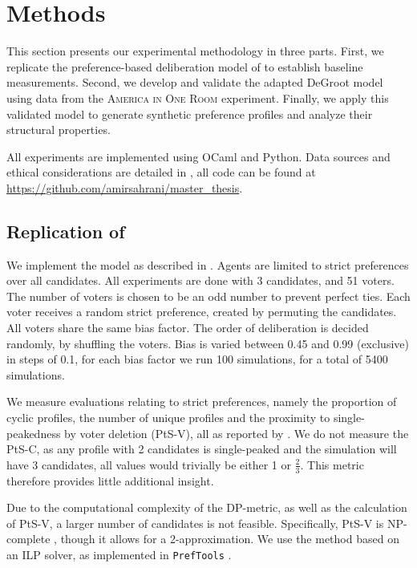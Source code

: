 \chapter{Methods}
\label{Methods}



This section presents our experimental methodology in three parts. First, we
replicate the preference-based deliberation model of
\citet{radDeliberationSinglePeakednessCoherent2021} to establish baseline
measurements. Second, we develop and validate the adapted DeGroot model using
data from the \textsc{America in One Room} experiment. Finally, we apply this validated
model to generate synthetic preference profiles and analyze their structural
properties.

All experiments are
implemented using OCaml and Python. Data sources and ethical considerations are
detailed in , all code can be found at \url{https://github.com/amirsahrani/master_thesis}.


\section{Replication of \citet{radDeliberationSinglePeakednessCoherent2021}}

We implement the model as described in . Agents are
limited to strict preferences over all candidates. All experiments are done with
3 candidates, and 51 voters. The number of voters is chosen to be an odd number
to prevent perfect ties. Each voter receives a random strict preference, created
by permuting the candidates. All voters share the same bias factor. The order of
deliberation is decided randomly, by shuffling the voters. Bias is varied
between 0.45 and 0.99 (exclusive) in steps of 0.1, for each bias factor we run 100
simulations, for a total of 5400 simulations.


We measure evaluations relating to strict preferences, namely the
proportion of cyclic profiles, the number of unique profiles and the proximity
to single-peakedness by voter deletion (PtS-V), all as reported by
\citet{radDeliberationSinglePeakednessCoherent2021}. We do not measure the PtS-C, as any
profile with 2 candidates is single-peaked and the simulation will have 3
candidates, all values would trivially be either 1 or $\frac{2}{3}$.  This metric therefore
provides little additional insight.

Due to the computational complexity of the
DP-metric, as well as the calculation of PtS-V, a larger number of candidates is not
feasible. Specifically, PtS-V is NP-complete
\cite{erdelyiComputationalAspectsNearly2013}, though it allows for a
2-approximation. We use the method based on an ILP solver, as implemented in
\texttt{PrefTools} \cite{PrefLibPreflibtools2025}.



